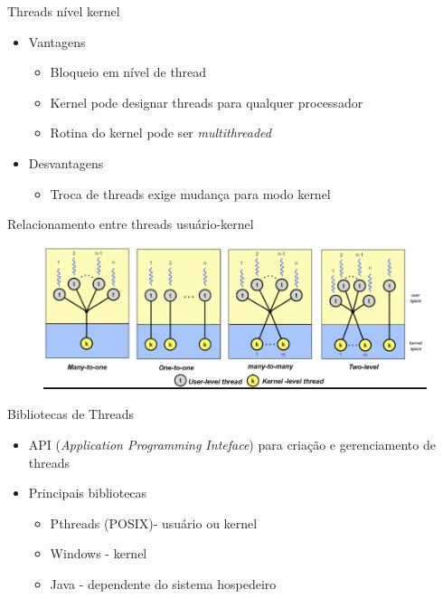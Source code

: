 \documentclass[aspectratio=169,
				xcolor=table]{beamer}
\begin{document}
	\begin{frame}{Threads nível kernel}
		\begin{itemize}
			\item Vantagens
			\begin{itemize}
				\item Bloqueio em nível de thread
				\item Kernel pode designar threads para qualquer processador
				\item Rotina do kernel pode ser \textit{multithreaded}
			\end{itemize}
			\vspace{1em}
			\item Desvantagens
			\begin{itemize}
				\item Troca de threads exige mudança para modo kernel
			\end{itemize}
		\end{itemize}
	\end{frame}
	
	\begin{frame}{Relacionamento entre threads usuário-kernel}

		\begin{figure}[hbtp]
			\centering
			\includegraphics[width=.85\textwidth, keepaspectratio]{../figs/cap04/threadrelation.png}
		\end{figure}		
	\end{frame}
	
	\begin{frame}{Bibliotecas de Threads}
		\begin{itemize}
			\item API (\textit{Application Programming Inteface}) para criação e gerenciamento de threads
			\item Principais bibliotecas
			\begin{itemize}
				\item Pthreads (POSIX)- usuário ou kernel
				\item Windows - kernel
				\item Java - dependente do sistema hospedeiro
			\end{itemize}
		\end{itemize}
	\end{frame}
	
\end{document}
